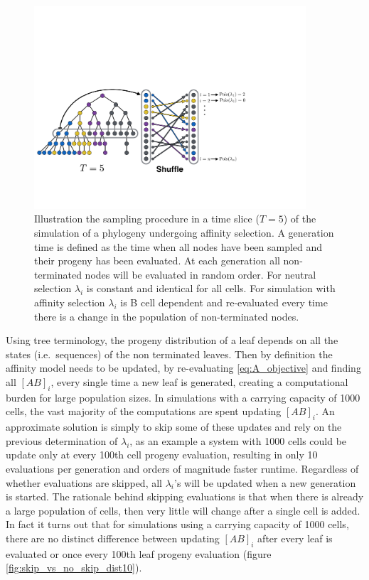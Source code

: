 \begin{figure}[!ht]
    \centering
    \includegraphics[width=0.9\textwidth]{figures/tree_iteration.pdf}
    \caption{
        \label{fig:tree_iteration}
        Illustration the sampling procedure in a time slice ($T=5$) of the simulation of a phylogeny undergoing affinity selection.
        A generation time is defined as the time when all nodes have been sampled and their progeny has been evaluated.
        At each generation all non-terminated nodes will be evaluated in random order.
        For neutral selection $\lambda_i$ is constant and identical for all cells.
        For simulation with affinity selection $\lambda_i$ is B cell dependent and re-evaluated every time there is a change in the population of non-terminated nodes.
    }
\end{figure}


Using tree terminology, the progeny distribution of a leaf depends on all the states (i.e.\ sequences) of the non terminated leaves.
Then by definition the affinity model needs to be updated, by re-evaluating \eqref{eq:A_objective} and finding all $[AB]_i$, every single time a new leaf is generated, creating a computational burden for large population sizes.
In simulations with a carrying capacity of 1000 cells, the vast majority of the computations are spent updating $[AB]_i$.
An approximate solution is simply to skip some of these updates and rely on the previous determination of $\lambda_i$, as an example a system with 1000 cells could be update only at every 100th cell progeny evaluation, resulting in only 10 evaluations per generation and orders of magnitude faster runtime.
Regardless of whether evaluations are skipped, all $\lambda_i$'s will be updated when a new generation is started.
The rationale behind skipping evaluations is that when there is already a large population of cells, then very little will change after a single cell is added.
In fact it turns out that for simulations using a carrying capacity of 1000 cells, there are no distinct difference between updating $[AB]_i$ after every leaf is evaluated or once every 100th leaf progeny evaluation (figure \ref{fig:skip_vs_no_skip_dist10}).

